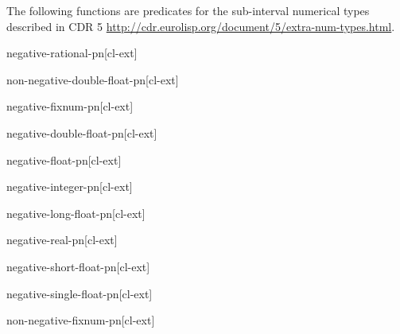 \documentclass[10pt,english]{book}
\begin{document}
The following functions are predicates for the sub-interval numerical
types described in CDR 5
\url{http://cdr.eurolisp.org/document/5/extra-num-types.html}.

\begin{function}{negative-rational-p}{n}[cl-ext]
  
\end{function}

\begin{function}{non-negative-double-float-p}{n}[cl-ext]
  
\end{function}

\begin{function}{negative-fixnum-p}{n}[cl-ext]
  
\end{function}

\begin{function}{negative-double-float-p}{n}[cl-ext]
  
\end{function}

\begin{function}{negative-float-p}{n}[cl-ext]
  
\end{function}

\begin{function}{negative-integer-p}{n}[cl-ext]
  
\end{function}

\begin{function}{negative-long-float-p}{n}[cl-ext]
  
\end{function}

\begin{function}{negative-real-p}{n}[cl-ext]
  
\end{function}

\begin{function}{negative-short-float-p}{n}[cl-ext]
  
\end{function}

\begin{function}{negative-single-float-p}{n}[cl-ext]
  
\end{function}

\begin{function}{non-negative-fixnum-p}{n}[cl-ext]
  
\end{function}
\end{document}
